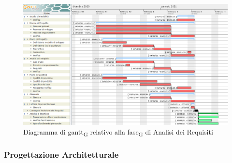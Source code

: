 \begin{figure}[H]
	\centering
	\includegraphics[scale=0.45]{res/images/02_gantt_analisi_requisiti.png}
	\caption{Diagramma di \gls{gantt}\textsubscript{G} relativo alla \gls{fase}\textsubscript{G} di Analisi dei Requisiti}
\end{figure}


\subsubsection{Progettazione Architetturale}

